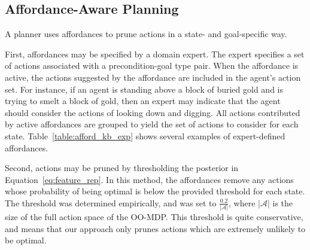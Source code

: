 \documentclass[letterpaper]{article}
\begin{document}

\subsection{Affordance-Aware Planning}
\label{sec:action_pruning}
A planner uses affordances to prune actions in a state- and
goal-specific way.

First, affordances may be specified by a domain expert.  The expert
specifies a set of actions associated with a precondition-goal type
pair. When the affordance is active, the actions suggested by the
affordance are included in the agent's action set. For instance, if an
agent is standing above a block of buried gold and is trying to smelt
a block of gold, then an expert may indicate that the agent should
consider the actions of looking down and digging.  All actions
contributed by active affordances are grouped to yield the set of
actions to consider for each state. Table~\ref{table:afford_kb_exp}
shows several examples of expert-defined affordances.

Second, actions may be pruned by thresholding the posterior in
Equation~\ref{eq:feature_rep}.  In this method, the affordances remove
any actions whose probability of being optimal is below the provided
threshold for each state. The threshold was determined empirically,
and was set to $\frac{0.2}{|\mathcal{A}|}$, where $|\mathcal{A}|$ is
the size of the full action space of the OO-MDP.  This threshold is
quite conservative, and means that our approach only prunes actions
which are extremely unlikely to be optimal.

\end{document}
